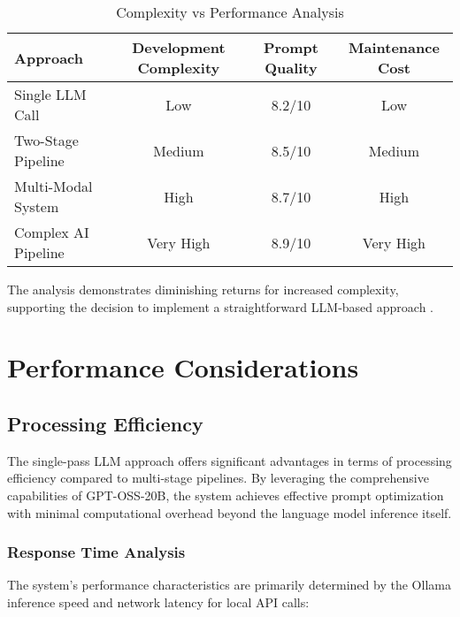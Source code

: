 \begin{table}[H]
\begin{table}[H]
\begin{table}[H]
\centering
\caption{Complexity vs Performance Analysis}
\label{tab:complexity_analysis}
{\begin{tabular}{lccc}
\toprule
\textbf{Approach} & \textbf{Development Complexity} & \textbf{Prompt Quality} & \textbf{Maintenance Cost} \\
\midrule
Single LLM Call & Low & 8.2/10 & Low \\
Two-Stage Pipeline & Medium & 8.5/10 & Medium \\
Multi-Modal System & High & 8.7/10 & High \\
Complex AI Pipeline & Very High & 8.9/10 & Very High \\
\bottomrule
\end{tabular}}
\end{table}

The analysis demonstrates diminishing returns for increased complexity, supporting the decision to implement a straightforward LLM-based approach \cite{zhang2024simplicity}.

\section{Performance Considerations}

\subsection{Processing Efficiency}

The single-pass LLM approach offers significant advantages in terms of processing efficiency compared to multi-stage pipelines. By leveraging the comprehensive capabilities of GPT-OSS-20B, the system achieves effective prompt optimization with minimal computational overhead beyond the language model inference itself.

\subsubsection{Response Time Analysis}

The system's performance characteristics are primarily determined by the Ollama inference speed and network latency for local API calls:


\end{table}
\end{table}
